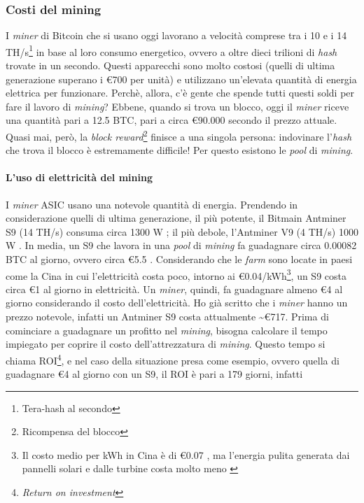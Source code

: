 \documentclass {article}
\begin{document}
\subsubsection {Costi del mining}

I \textit{miner} di Bitcoin che si usano oggi lavorano a velocità comprese tra i 10 e i 14 TH/s\footnote{Tera-hash al secondo} in base al loro consumo energetico, ovvero a oltre dieci trilioni di \textit{hash} trovate in un secondo.
Questi apparecchi sono molto costosi (quelli di ultima generazione superano i \euro{700} per unità) e utilizzano un'elevata quantità di energia elettrica per funzionare.
Perchè, allora, c'è gente che spende tutti questi soldi per fare il lavoro di \textit{mining}?
Ebbene, quando si trova un blocco, oggi il \textit{miner} riceve una quantità pari a 12.5 BTC, pari a circa \euro{90.000} secondo il prezzo attuale.
Quasi mai, però, la \textit{block reward}\footnote{Ricompensa del blocco} finisce a una singola persona: indovinare l'\textit{hash} che trova il blocco è estremamente difficile!
Per questo esistono le \textit{pool} di \textit{mining}.

\paragraph {L'uso di elettricità del mining}

I \textit{miner} ASIC usano una notevole quantità di energia. Prendendo in considerazione quelli di ultima generazione, il più potente, il Bitmain Antminer S9 (14 TH/s) consuma circa 1300 W \cite{antminers9}; il più debole, l'Antminer V9 (4 TH/s) 1000 W \cite{antminerv9}.
In media, un S9 che lavora in una \textit{pool} di \textit{mining} fa guadagnare circa 0.00082 BTC al giorno, ovvero circa \euro{5.5} \cite{s9profit}.
Considerando che le \textit{farm} sono locate in paesi come la Cina in cui l'elettricità costa poco, intorno ai \euro{0.04}/kWh\footnote{Il costo medio per kWh in Cina è di \euro{0.07} \cite{chinaaverage}, ma l'energia pulita generata dai pannelli solari e dalle turbine costa molto meno \cite{chinaless}}, un S9 costa circa \euro{1} al giorno in elettricità.
Un \textit{miner}, quindi, fa guadagnare almeno \euro{4} al giorno considerando il costo dell'elettricità.
Ho già scritto che i \textit{miner} hanno un prezzo notevole, infatti un Antminer S9 costa attualmente \textasciitilde \euro{717}.
Prima di cominciare a guadagnare un profitto nel \textit{mining}, bisogna calcolare il tempo impiegato per coprire il costo dell'attrezzatura di \textit{mining}.
Questo tempo si chiama ROI\footnote{\textit{Return on investment}}, e nel caso della situazione presa come esempio, ovvero quella di guadagnare \euro{4} al giorno con un S9, il ROI è pari a 179 giorni, infatti
\end{document}
